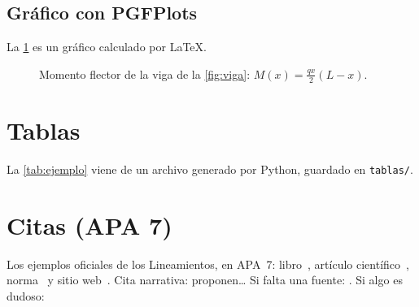\subsection{Gráfico con PGFPlots}

La \cref{fig:momento} es un gráfico calculado por LaTeX.

\begin{figure}[htbp]
  \centering
  \caption{Momento flector de la viga de la \cref{fig:viga}: $M(x) = \tfrac{q x}{2}(L-x)$.}
  \label{fig:momento}
\end{figure}

\section{Tablas}

La \cref{tab:ejemplo} viene de un archivo generado por Python, guardado en \texttt{tablas/}.
\begin{table}[htbp]
  \centering
  \caption{Tabla generada automáticamente desde \texttt{04\_analisis}.}
  \label{tab:ejemplo}
  
\end{table}

\section{Citas (APA 7)}

Los ejemplos oficiales de los Lineamientos, en APA~7:
libro~\parencite{suarez2014analisis},
artículo científico~\parencite{zhou2026performance},
norma~\parencite{inn2009nch433}
y sitio web~\parencite{mop2026proyectos}.
Cita narrativa: \textcite{zhou2026performance} proponen\dots
Si falta una fuente: .
Si algo es dudoso: 
